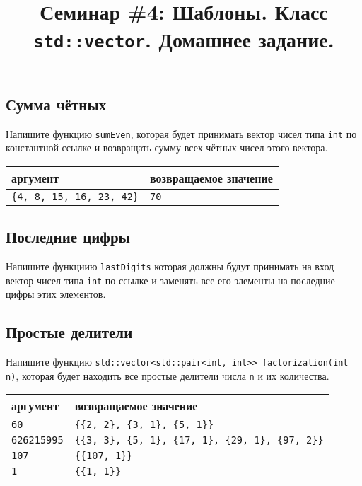 \documentclass{article}
\begin{document}
\title{Семинар \#4: Шаблоны. Класс \texttt{std::vector}. Домашнее задание.\vspace{-5ex}}\date{}\maketitle

\subsection{Сумма чётных}
Напишите функцию \texttt{sumEven}, которая будет принимать вектор чисел типа \texttt{int} по константной ссылке и возвращать сумму всех чётных чисел этого вектора.
\begin{center}
\begin{tabular}{ l | l }
 аргумент & возвращаемое значение \\ \hline
 \texttt{\{4, 8, 15, 16, 23, 42\}} & \texttt{70}
\end{tabular}
\end{center}

\subsection{Последние цифры}
Напишите функциию \texttt{lastDigits} которая должны будут принимать на вход вектор чисел типа \texttt{int} по ссылке и заменять все его элементы на последние цифры этих элементов.

\subsection{Простые делители}
Напишите функцию \texttt{std::vector<std::pair<int, int>{}> factorization(int n)}, которая будет находить все простые делители числа \texttt{n} и их количества.
\begin{center}
\begin{tabular}{ l | l }
 аргумент & возвращаемое значение \\ \hline
 \texttt{60} & \texttt{\{\{2, 2\}, \{3, 1\}, \{5, 1\}\}} \\
 \texttt{626215995} & \texttt{\{\{3, 3\}, \{5, 1\}, \{17, 1\}, \{29, 1\}, \{97, 2\}\}} \\
 \texttt{107} & \texttt{\{\{107, 1\}\}} \\
 \texttt{1} & \texttt{\{\{1, 1\}\}} 
\end{tabular}
\end{center}
\end{document}
